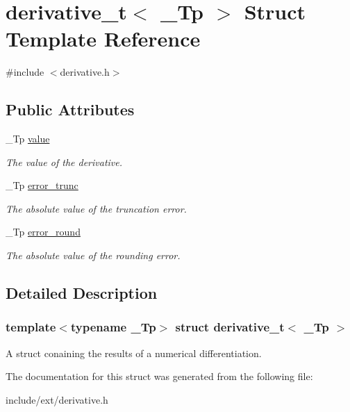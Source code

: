 \hypertarget{structderivative__t}{}\section{derivative\+\_\+t$<$ \+\_\+\+Tp $>$ Struct Template Reference}
\label{structderivative__t}


{\ttfamily \#include $<$derivative.\+h$>$}

\subsection*{Public Attributes}
\begin{DoxyCompactItemize}
\item 
\mbox{\label{structderivative__t_a80c4b0dfdc6e2dcc8a9802d60dbb73ee}} 
\+\_\+\+Tp \hyperlink{structderivative__t_a80c4b0dfdc6e2dcc8a9802d60dbb73ee}{value}
\begin{DoxyCompactList}\small\item\em The value of the derivative. \end{DoxyCompactList}\item 
\mbox{\label{structderivative__t_ac9a4904da8901950967bdc5e6b1cc012}} 
\+\_\+\+Tp \hyperlink{structderivative__t_ac9a4904da8901950967bdc5e6b1cc012}{error\+\_\+trunc}
\begin{DoxyCompactList}\small\item\em The absolute value of the truncation error. \end{DoxyCompactList}\item 
\mbox{\label{structderivative__t_a423825c0784d7156c5e71075eb6c2103}} 
\+\_\+\+Tp \hyperlink{structderivative__t_a423825c0784d7156c5e71075eb6c2103}{error\+\_\+round}
\begin{DoxyCompactList}\small\item\em The absolute value of the rounding error. \end{DoxyCompactList}\end{DoxyCompactItemize}


\subsection{Detailed Description}
\subsubsection*{template$<$typename \+\_\+\+Tp$>$\newline
struct derivative\+\_\+t$<$ \+\_\+\+Tp $>$}

A struct conaining the results of a numerical differentiation. 

The documentation for this struct was generated from the following file\+:\begin{DoxyCompactItemize}
\item 
include/ext/derivative.\+h\end{DoxyCompactItemize}
